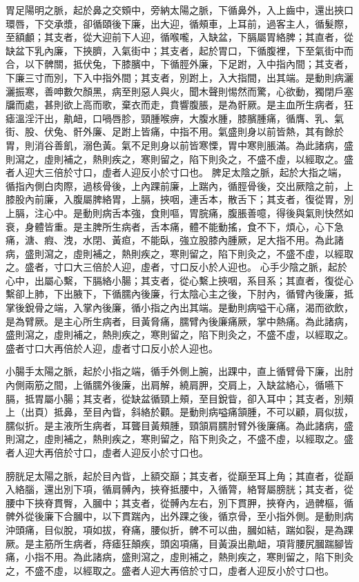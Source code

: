 胃足陽明之脈，起於鼻之交頞中，旁納太陽之脈，下循鼻外，入上齒中，還出挾口環唇，下交承漿，卻循頤後下廉，出大迎，循頰車，上耳前，過客主人，循髮際，至額顱；其支者，從大迎前下人迎，循喉嚨，入缺盆，下膈屬胃絡脾；其直者，從缺盆下乳內廉，下挾臍，入氣街中；其支者，起於胃口，下循腹裡，下至氣街中而合，以下髀關，抵伏兔，下膝臏中，下循脛外廉，下足跗，入中指內間；其支者，下廉三寸而別，下入中指外間；其支者，別跗上，入大指間，出其端。是動則病灑灑振寒，善呻數欠顏黑，病至則惡人與火，聞木聲則惕然而驚，心欲動，獨閉戶塞牖而處，甚則欲上高而歌，棄衣而走，賁響腹脹，是為骭厥。是主血所生病者，狂瘧溫淫汗出，鼽衄，口喎唇胗，頸腫喉痹，大腹水腫，膝臏腫痛，循膺、乳、氣街、股、伏兔、骭外廉、足跗上皆痛，中指不用。氣盛則身以前皆熱，其有餘於胃，則消谷善飢，溺色黃。氣不足則身以前皆寒慄，胃中寒則脹滿。為此諸病，盛則瀉之，虛則補之，熱則疾之，寒則留之，陷下則灸之，不盛不虛，以經取之。盛者人迎大三倍於寸口，虛者人迎反小於寸口也。
脾足太陰之脈，起於大指之端，循指內側白肉際，過核骨後，上內踝前廉，上踹內，循脛骨後，交出厥陰之前，上膝股內前廉，入腹屬脾絡胃，上膈，挾咽，連舌本，散舌下；其支者，復從胃，別上膈，注心中。是動則病舌本強，食則嘔，胃脘痛，腹脹善噫，得後與氣則快然如衰，身體皆重。是主脾所生病者，舌本痛，體不能動搖，食不下，煩心，心下急痛，溏、瘕、洩，水閉、黃疸，不能臥，強立股膝內腫厥，足大指不用。為此諸病，盛則瀉之，虛則補之，熱則疾之，寒則留之，陷下則灸之，不盛不虛，以經取之。盛者，寸口大三倍於人迎，虛者，寸口反小於人迎也。
心手少陰之脈，起於心中，出屬心繫，下膈絡小腸；其支者，從心繫上挾咽，系目系；其直者，復從心繫卻上肺，下出腋下，下循臑內後廉，行太陰心主之後，下肘內，循臂內後廉，抵掌後銳骨之端，入掌內後廉，循小指之內出其端。是動則病嗌干心痛，渴而欲飲，是為臂厥。是主心所生病者，目黃脅痛，臑臂內後廉痛厥，掌中熱痛。為此諸病，盛則瀉之，虛則補之，熱則疾之，寒則留之，陷下則灸之，不盛不虛，以經取之。盛者寸口大再倍於人迎，虛者寸口反小於人迎也。

小腸手太陽之脈，起於小指之端，循手外側上腕，出踝中，直上循臂骨下廉，出肘內側兩筋之間，上循臑外後廉，出肩解，繞肩胛，交肩上，入缺盆絡心，循嚥下膈，抵胃屬小腸；其支者，從缺盆循頸上頰，至目銳眥，卻入耳中；其支者，別頰上（出頁）抵鼻，至目內眥，斜絡於顴。是動則病嗌痛頷腫，不可以顧，肩似拔，臑似折。是主液所生病者，耳聾目黃頰腫，頸頷肩臑肘臂外後廉痛。為此諸病，盛則瀉之，虛則補之，熱則疾之，寒則留之，陷下則灸之，不盛不虛，以經取之。盛者人迎大再倍於寸口，虛者人迎反小於寸口也。

膀胱足太陽之脈，起於目內眥，上額交巔；其支者，從巔至耳上角；其直者，從巔入絡腦，還出別下項，循肩髆內，挾脊抵腰中，入循膂，絡腎屬膀胱；其支者，從腰中下挾脊貫臀，入膕中；其支者，從髆內左右，別下貫胛，挾脊內，過髀樞，循髀外從後廉下合膕中，以下貫踹內，出外踝之後，循京骨，至小指外側。是動則病沖頭痛，目似脫，項如拔，脊痛，腰似折，髀不可以曲，膕如結，踹如裂，是為踝厥。是主筋所生病者，痔瘧狂顛疾，頭囟項痛，目黃淚出鼽衄，項背腰尻膕踹腳皆痛，小指不用。為此諸病，盛則瀉之，虛則補之，熱則疾之，寒則留之，陷下則灸之，不盛不虛，以經取之。盛者人迎大再倍於寸口，虛者人迎反小於寸口也。

